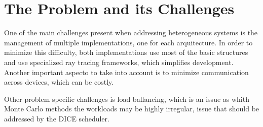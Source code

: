 \chapter{The Problem and its Challenges}




One of the main challenges present when addressing heterogeneous systems is the management of multiple implementations, one for each arquitecture. In order to minimize this difficulty, both implementations use most of the basic structures and use specialized ray tracing frameworks, which simplifies development. Another important aspecto to take into account is to minimize communication across devices, which can be costly.

Other problem specific challenges is load ballancing, which is an issue as whith Monte Carlo methods the workloads may be highly irregular, issue that should be addressed by the DICE scheduler.

